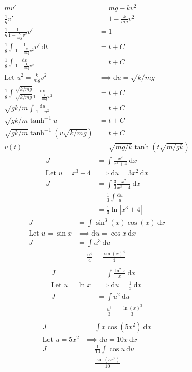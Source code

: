 \documentclass{article}
\theoremstyle{plain}
\theoremstyle{definition}
\begin{document}
\begin{align*}
	mv' &= mg - kv^2 \\
	\frac{1}{g} v' &= 1 - \frac{k}{mg}v^2 \\
	\frac{1}{g}\frac{1}{1 - \frac{k}{mg}v^2} v' &= 1 \\
	\frac{1}{g}\int \frac{1}{1 - \frac{k}{mg}v^2} v'\ \text{d}t &= t+C \\
	\frac{1}{g}\int \frac{\text{d}v}{1 - \frac{k}{mg}v^2}  &= t+C \\
	\text{Let } u^2 = \frac{k}{mg}v^2 &\implies \text{d}u = \sqrt{k/mg} \\
	\frac{1}{g}\int\frac{\sqrt{k/mg}}{\sqrt{k/mg}} \frac{\text{d}v}{1 - 
	\frac{k}{mg}v^2}  &= t+C \\
	\sqrt{gk/m}\int \frac{\text{d}u}{1-u^2}&=t+C \\
	\sqrt{gk/m} \tanh^{-1} u&=t+C \\
	\sqrt{gk/m} \tanh^{-1}{\left(v\sqrt{k/mg}\right)} &=t+C \\
	v(t) &= \sqrt{mg/k} \tanh{\left(t\sqrt{m/gk}\right)} 
\end{align*}
\begin{align*}
	J&=\int \frac{x^2}{x^3+4}\ \text{d}x \\
	\text{Let } u = x^3+4 &\implies \text{d}u = 3x^2\ \text{d}x \\
	J&=\int \frac{3}{3}\frac{x^2}{x^3+4}\ \text{d}x \\
	 &=\frac{1}{3}\int \frac{\text{d}u}{u} \\
	 &=\frac{1}{3} \ln{\left|x^3+4\right|}
\end{align*}
\begin{align*}
	J&=\int \sin^3 (x)\cos(x)\ \text{d}x \\
	\text{Let } u = \sin x &\implies \text{d}u = \cos x\ \text{d}x \\
	J&=\int u^3\ \text{d}u \\
	 &=\frac{u^4}{4} = \frac{\sin{(x)}^4}{4} \\
\end{align*}
\begin{align*}
	J&=\int \frac{\ln^2 x}{x}\ \text{d}x \\
	\text{Let } u = \ln x &\implies \text{d}u = \frac{1}{x}\ \text{d}x \\
	J&=\int u^2\ \text{d}u \\
	 &=\frac{u^3}{3} = \frac{\ln{(x)}^3}{3} \\
\end{align*}
\begin{align*}
	J&=\int x \cos{\left(5x^2\right)}\ \text{d}x \\
	\text{Let } u = 5x^2 &\implies \text{d}u = 10x\ \text{d}x \\
	J&=\frac{1}{10}\int \cos u\ \text{d}u \\
	 &= \frac{\sin{\left(5x^2\right)}}{10} 
\end{align*}
\end{document}
